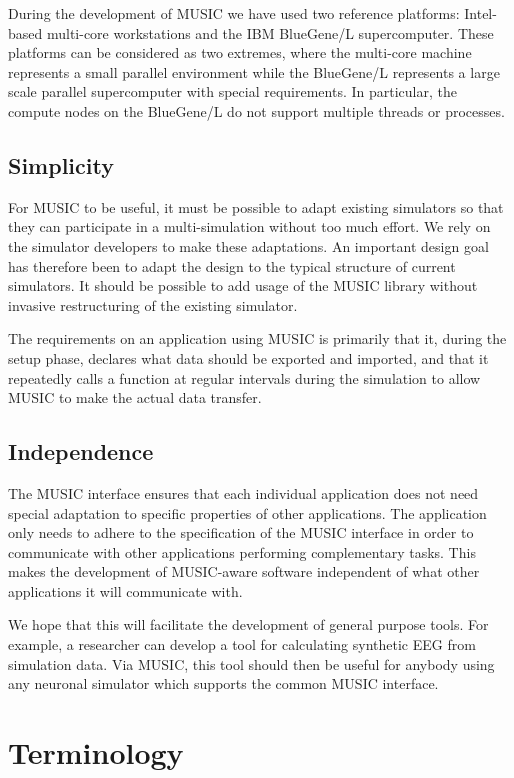 \documentclass[a4paper]{report}
\begin{document}
During the development of MUSIC we have used two reference platforms:
Intel-based multi-core workstations and the IBM
BlueGene/L supercomputer.  These
platforms can be considered as two extremes, where the multi-core
machine represents a small parallel environment while the BlueGene/L
represents a large scale parallel supercomputer with special
requirements.  In particular, the compute nodes on the BlueGene/L do
not support multiple threads or processes.


\subsection{Simplicity}

For MUSIC to be useful, it must be possible to adapt existing
simulators so that they can participate in a multi-simulation without
too much effort.  We rely on the simulator developers to make these
adaptations.  An important design goal has therefore been to adapt the
design to the typical structure of current simulators.  It should be
possible to add usage of the MUSIC library without invasive
restructuring of the existing simulator.

The requirements on an application using MUSIC is primarily that it,
during the setup phase, declares what data should be exported and
imported, and that it repeatedly calls a function at regular intervals
during the simulation to allow MUSIC to make the actual data transfer.


\subsection{Independence}

The MUSIC interface ensures that each individual application does not
need special adaptation to specific properties of other applications.
The application only needs to adhere to the specification of the MUSIC
interface in order to communicate with other applications performing
complementary tasks.  This makes the development of MUSIC-aware
software independent of what other applications it will communicate
with.

We hope that this will facilitate the development of general purpose
tools.  For example, a researcher can develop a tool for calculating
synthetic EEG from simulation data.  Via MUSIC, this tool should then
be useful for anybody using any neuronal simulator which supports the
common MUSIC interface.


\section{Terminology}
\end{document}
